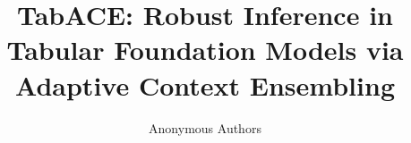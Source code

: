 \documentclass{article}
\title{TabACE: Robust Inference in Tabular Foundation Models via Adaptive Context Ensembling}
\author{Anonymous Authors}
\begin{document}
\maketitle

\begin{abstract}

\end{abstract}









\FloatBarrier



\appendix

\end{document}
